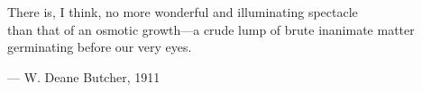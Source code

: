 
\begin{flushright}
\begin{hangleftquote}{\QENOpen}{\QENClose}
There is, I think, no more wonderful and illuminating spectacle\\
than that of an osmotic growth—a crude lump of brute inanimate matter\\
germinating before our very eyes.
\end{hangleftquote}
\par\smallskip
\normalfont — W. Deane Butcher, 1911
\end{flushright}
